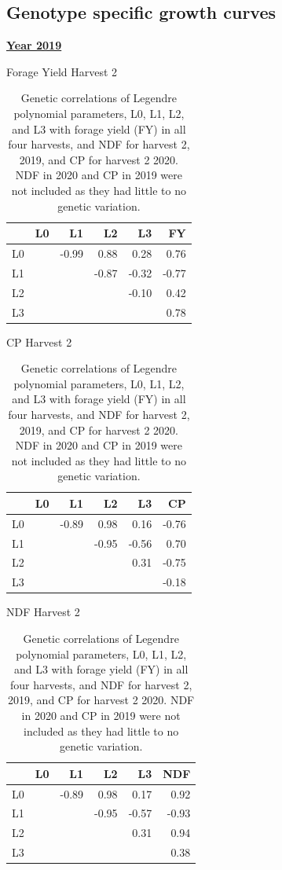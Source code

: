 \documentclass[12pt, letterpaper]{article}
\begin{document}
\subsection{Genotype specific growth curves}

\begin{table}[h]
\caption{Genetic correlations of Legendre polynomial parameters, L0, L1, L2, and L3 with forage yield (FY) in all four harvests, and NDF for harvest 2, 2019, and CP for harvest 2 2020. NDF in 2020 and CP in 2019 were not included as they had little to no genetic variation.}
\noindent%
\begin{minipage}[h]{.45\textwidth}
\centering

\textbf{\underline{Year 2019}}

\medskip

Forage Yield Harvest 2

\medskip

\begin{tabular}{rrrrrr}
 & L0 & L1 & L2 & L3 & FY \\ 
  \hline
  L0 &  & -0.99 & 0.88 & 0.28 & 0.76 \\ 
  L1 & &  & -0.87 & -0.32 & -0.77 \\ 
  L2 & & &  & -0.10 & 0.42 \\ 
  L3 & & & &  & 0.78 \\ 
   \hline
\end{tabular}

\bigskip
\bigskip

CP Harvest 2

\medskip

\begin{tabular}{rrrrrr}
 & L0 & L1 & L2 & L3 & CP \\ 
  \hline
  L0 &  & -0.89 & 0.98 & 0.16 & -0.76 \\ 
  L1 & & & -0.95 & -0.56 & 0.70 \\ 
  L2 & & & & 0.31 & -0.75 \\ 
  L3 & & & & & -0.18 \\ 
   \hline
\end{tabular}
\bigskip
\bigskip

NDF Harvest 2

\medskip

\begin{tabular}{rrrrrr}
 & L0 & L1 & L2 & L3 & NDF \\ 
  \hline
  L0 & & -0.89 & 0.98 & 0.17 & 0.92 \\ 
  L1 & & & -0.95 & -0.57 & -0.93 \\ 
  L2 & & & & 0.31 & 0.94 \\ 
  L3 & & & & & 0.38 \\ 
   \hline
\end{tabular}


\end{minipage}
\end{table}
\end{document}
